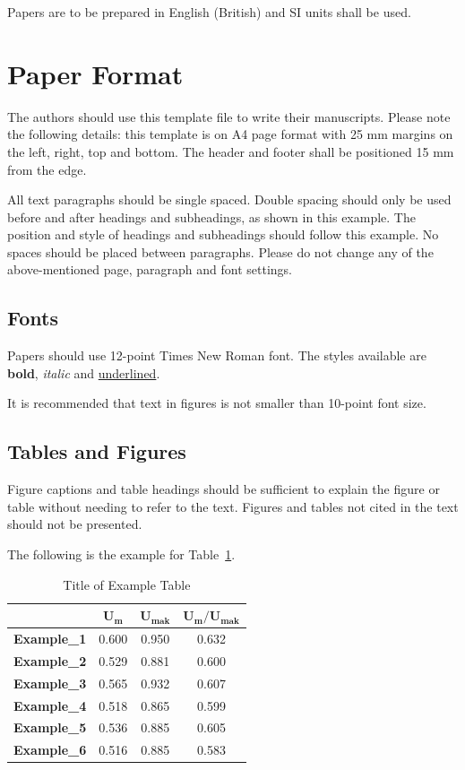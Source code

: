 \documentclass[a4paper,12pt]{article}
\begin{document}
Papers are to be prepared in English (British) and SI units shall be used.

\section{Paper Format}
The authors should use this template file to write their manuscripts. Please
note the following details: this template is on A4 page format with 25 mm
margins on the left, right, top and bottom. The header and footer shall be
positioned 15 mm from the edge.

All text paragraphs should be single spaced. Double spacing should only be used
before and after headings and subheadings, as shown in this example. The
position and style of headings and subheadings should follow this example. No
spaces should be placed between paragraphs. Please do not change any of the
above-mentioned page, paragraph and font settings.

\subsection{Fonts}
Papers should use 12-point Times New Roman font. The styles available are
\textbf{bold}, \textit{italic} and \underline{underlined}.

It is recommended that text in figures is not smaller than 10-point font size.

\subsection{Tables and Figures}
Figure captions and table headings should be sufficient to explain the figure
or table without needing to refer to the text. Figures and tables not cited in
the text should not be presented.

The following is the example for Table~\ref{tab:example}.

\begin{table}[H]
  \centering
  \caption{Title of Example Table}
  \label{tab:example}
  \begin{tabular}{lccc}
    \toprule
                        & $\mathbf{U_m}$ & $\mathbf{U_{mak}}$ & $\mathbf{U_m / U_{mak}}$ \\
    \midrule
    \textbf{Example\_1} & 0.600 & 0.950 & 0.632 \\
    \textbf{Example\_2} & 0.529 & 0.881 & 0.600 \\
    \textbf{Example\_3} & 0.565 & 0.932 & 0.607 \\
    \textbf{Example\_4} & 0.518 & 0.865 & 0.599 \\
    \textbf{Example\_5} & 0.536 & 0.885 & 0.605 \\
    \textbf{Example\_6} & 0.516 & 0.885 & 0.583 \\
    \bottomrule
  \end{tabular}
\end{table}
\end{document}
